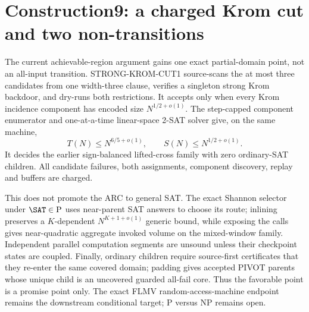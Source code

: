 \section{Construction9: a charged Krom cut and two non-transitions}
\label{sec:construction9-main4}

The current achievable-region argument gains one exact partial-domain
point, not an all-input transition.  \textsc{STRONG-KROM-CUT1} source-scans
the at most three candidates from one width-three clause, verifies a
singleton strong Krom backdoor, and dry-runs both restrictions.  It accepts
only when every Krom incidence component has encoded size
$N^{1/2+o(1)}$.  The step-capped component enumerator and one-at-a-time
linear-space 2-SAT solver give, on the same machine,
\[
 T(N)\le N^{6/5+o(1)},\qquad S(N)\le N^{1/2+o(1)}.
\]
It decides the earlier sign-balanced lifted-cross family with zero
ordinary-SAT children.  All candidate failures, both assignments,
component discovery, replay and buffers are charged.

This does not promote the ARC to general SAT.  The exact Shannon selector
under $\SAT\in\mathrm P$ uses near-parent SAT answers to choose its route;
inlining preserves a $K$-dependent $N^{K+1+o(1)}$ generic bound, while
exposing the calls gives near-quadratic aggregate invoked volume on the
mixed-window family.  Independent parallel computation segments are
unsound unless their checkpoint states are coupled.  Finally, ordinary
children require source-first certificates that they re-enter the same
covered domain; padding gives accepted PIVOT parents whose unique child is
an uncovered guarded all-fail core.  Thus the favorable point is a promise
point only.  The exact FLMV random-access-machine endpoint remains the
downstream conditional target; P versus NP remains open.
